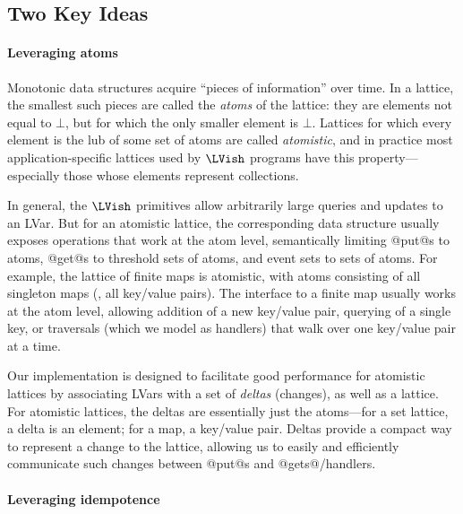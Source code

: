 \subsection{Two Key Ideas}\label{subsection:atomic}


\paragraph{Leveraging atoms}

Monotonic data structures acquire ``pieces of
information'' over time.  In a lattice, the smallest such pieces are called the
\emph{atoms} of the lattice: they are elements not equal to $\bot$, but for
which the only smaller element is $\bot$.  Lattices for which every element is
the lub of some set of atoms are called \emph{atomistic}, and in practice most
application-specific lattices used by $\LVish$ programs 
have this property---especially those whose elements represent
collections.

In general, the $\LVish$ primitives allow arbitrarily large queries and updates
to an LVar.  But for an atomistic lattice, the corresponding data structure
usually exposes operations that work at the atom level, semantically limiting
@put@s to atoms, @get@s to threshold sets of atoms, and event sets to sets of
atoms.  For example, the lattice of finite maps is atomistic, with atoms
consisting of all singleton maps (\ie, all key/value pairs).  The interface to a
finite map usually works at the atom level, allowing addition of a new
key/value pair, querying of a single key, or traversals (which we model as
handlers) that walk over one key/value pair at a time.

Our implementation is designed to facilitate good performance for atomistic
lattices by associating LVars with a set of \emph{deltas} (changes), as well as
a lattice.  For atomistic lattices, the deltas are essentially just the
atoms---for a set lattice, a delta is an element; for a map, a key/value pair.
Deltas provide a compact way to represent a change to the lattice, allowing us
to easily and efficiently communicate such changes between @put@s and
@gets@/handlers.

\paragraph{Leveraging idempotence}

